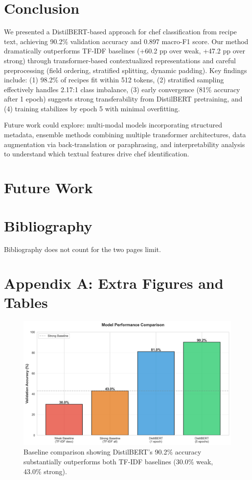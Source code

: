 \documentclass[twocolumn,10pt]{article}
\begin{document}
\section{Conclusion}

We presented a DistilBERT-based approach for chef classification from recipe text, achieving 90.2\% validation accuracy and 0.897 macro-F1 score. Our method dramatically outperforms TF-IDF baselines (+60.2 pp over weak, +47.2 pp over strong) through transformer-based contextualized representations and careful preprocessing (field ordering, stratified splitting, dynamic padding). Key findings include: (1) 98.2\% of recipes fit within 512 tokens, (2) stratified sampling effectively handles 2.17:1 class imbalance, (3) early convergence (81\% accuracy after 1 epoch) suggests strong transferability from DistilBERT pretraining, and (4) training stabilizes by epoch 5 with minimal overfitting.

Future work could explore: multi-modal models incorporating structured metadata, ensemble methods combining multiple transformer architectures, data augmentation via back-translation or paraphrasing, and interpretability analysis to understand which textual features drive chef identification.

\section{Future Work}

\section*{Bibliography}



Bibliography does not count for the two pages limit.


\appendix

\section*{Appendix A: Extra Figures and Tables}

\begin{figure}[h]
\centering
\includegraphics[width=0.8\columnwidth]{../results/figures/baseline_comparison.png}
\caption{Baseline comparison showing DistilBERT's 90.2\% accuracy substantially outperforms both TF-IDF baselines (30.0\% weak, 43.0\% strong).}
\label{fig:baseline}
\end{figure}
\end{document}
